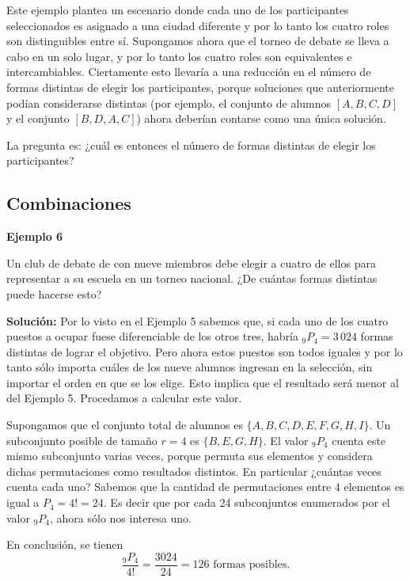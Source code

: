 \documentclass[
  letterpaper,
  DIV=11,
  numbers=noendperiod]{scrreprt}
\begin{document}
Este ejemplo plantea un escenario donde cada uno de los participantes
seleccionados es asignado a una ciudad diferente y por lo tanto los
cuatro roles son distinguibles entre sí. Supongamos ahora que el torneo
de debate se lleva a cabo en un solo lugar, y por lo tanto los cuatro
roles son equivalentes e intercambiables. Ciertamente esto llevaría a
una reducción en el número de formas distintas de elegir los
participantes, porque soluciones que anteriormente podían considerarse
distintas (por ejemplo, el conjunto de alumnos \([A, B, C, D]\) y el
conjunto \([B, D, A, C]\)) ahora deberían contarse como una única
solución.

La pregunta es: ¿cuál es entonces el número de formas distintas de
elegir los participantes?

\hypertarget{combinaciones}{%
\subsection{Combinaciones}\label{combinaciones}}

\begin{examplebox}

\begin{center}
\textbf{Ejemplo 6}

\end{center}

Un club de debate de con nueve miembros debe elegir a cuatro de ellos
para representar a su escuela en un torneo nacional. ¿De cuántas formas
distintas puede hacerse esto?

\textbf{Solución:} Por lo visto en el Ejemplo 5 sabemos que, si cada uno
de los cuatro puestos a ocupar fuese diferenciable de los otros tres,
habría \(_9P_4 = 3\,024\) formas distintas de lograr el objetivo. Pero
ahora estos puestos son todos iguales y por lo tanto sólo importa cuáles
de los nueve alumnos ingresan en la selección, sin importar el orden en
que se los elige. Esto implica que el resultado será menor al del
Ejemplo 5. Procedamos a calcular este valor.

Supongamos que el conjunto total de alumnos es
\(\{ A,B,C,D,E,F,G,H,I \}\). Un subconjunto posible de tamaño \(r=4\) es
\(\{ B, E, G, H \}\). El valor \(_9P_4\) cuenta este mismo subconjunto
varias veces, porque permuta sus elementos y considera dichas
permutaciones como resultados distintos. En particular ¿cuántas veces
cuenta cada uno? Sabemos que la cantidad de permutaciones entre 4
elementos es igual a \(P_4 = 4! = 24\). Es decir que por cada 24
subconjuntos enumerados por el valor \(_9P_4\), ahora sólo nos interesa
uno.

En conclusión, se tienen
\[\frac{_9P_4}{4!} = \frac{3024}{24} = 126 \text{ formas posibles.}\]

\end{examplebox}
\end{document}
